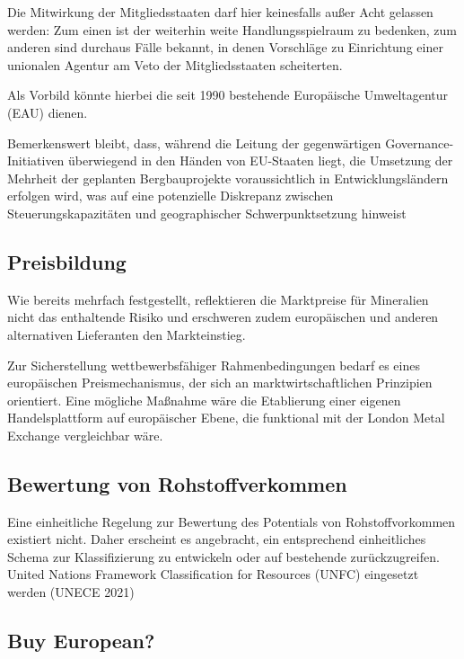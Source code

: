 \documentclass[12pt,a4paper,oneside]{book} %
\begin{document}
Die Mitwirkung der Mitgliedsstaaten darf hier keinesfalls außer Acht gelassen werden: Zum einen ist der weiterhin weite Handlungsspielraum zu bedenken, zum anderen sind durchaus Fälle bekannt, in denen Vorschläge zu Einrichtung einer unionalen Agentur am Veto der Mitgliedsstaaten scheiterten.\autocite[im konkreten Fall ging es um die Einführung einer EU-Agentur zur Kontrolle der Umsetzung des EU-Abfallrechts]{Dauses/Ludwigs, O. Umweltpolitik Rn. 226; Europäische Kommission: Study on the feasibility of the establishment of a Waste Implementation Agency}

Als Vorbild könnte hierbei die seit 1990 bestehende Europäische Umweltagentur (EAU) dienen.

Bemerkenswert bleibt, dass, während die Leitung der gegenwärtigen Governance-Initiativen überwiegend in den Händen von EU-Staaten liegt, die Umsetzung der Mehrheit der geplanten Bergbauprojekte voraussichtlich in Entwicklungsländern erfolgen wird, was auf eine potenzielle Diskrepanz zwischen Steuerungskapazitäten und geographischer Schwerpunktsetzung hinweist

\subsection{Preisbildung}
Wie bereits mehrfach festgestellt, reflektieren die Marktpreise für Mineralien nicht das enthaltende Risiko und erschweren zudem europäischen und anderen alternativen Lieferanten den Markteinstieg.

Zur Sicherstellung wettbewerbsfähiger Rahmenbedingungen bedarf es eines europäischen Preismechanismus, der sich an marktwirtschaftlichen Prinzipien orientiert. Eine mögliche Maßnahme wäre die Etablierung einer eigenen Handelsplattform auf europäischer Ebene, die funktional mit der London Metal Exchange vergleichbar wäre.

\subsection{Bewertung von Rohstoffverkommen}
Eine einheitliche Regelung zur Bewertung des Potentials von Rohstoffvorkommen existiert nicht. Daher erscheint es angebracht, ein entsprechend einheitliches Schema zur Klassifizierung zu entwickeln oder auf bestehende zurückzugreifen.
United Nations Framework Classification for Resources (UNFC) eingesetzt werden (UNECE 2021)

\subsection{Buy European?}
\end{document}

